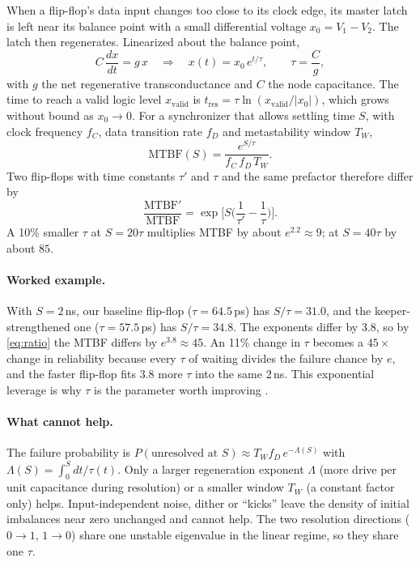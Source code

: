 \documentclass[11pt]{article}
\begin{document}
When a flip-flop's data input changes too close to its clock edge, its master latch is left near its balance point
with a small differential voltage $x_0 = V_1 - V_2$. The latch then regenerates. Linearized about the balance point,
\begin{equation}
C\,\frac{dx}{dt} = g\,x \quad\Longrightarrow\quad x(t) = x_0\,e^{t/\tau},\qquad \tau = \frac{C}{g},
\label{eq:lin}
\end{equation}
with $g$ the net regenerative transconductance and $C$ the node capacitance. The time to reach a valid logic level
$x_{\mathrm{valid}}$ is $t_{\mathrm{res}} = \tau\ln(x_{\mathrm{valid}}/|x_0|)$, which grows without bound as $x_0\to0$.
For a synchronizer that allows settling time $S$, with clock frequency $f_C$, data transition rate $f_D$ and
metastability window $T_W$,
\begin{equation}
\mathrm{MTBF}(S) = \frac{e^{S/\tau}}{f_C\,f_D\,T_W}.
\label{eq:mtbf}
\end{equation}
Two flip-flops with time constants $\tau'$ and $\tau$ and the same prefactor therefore differ by
\begin{equation}
\frac{\mathrm{MTBF}'}{\mathrm{MTBF}} = \exp\!\Big[S\Big(\frac{1}{\tau'}-\frac{1}{\tau}\Big)\Big].
\label{eq:ratio}
\end{equation}
A 10\% smaller $\tau$ at $S=20\tau$ multiplies MTBF by about $e^{2.2}\approx 9$; at $S=40\tau$ by about $85$.

\paragraph{Worked example.} With $S=2$\,ns, our baseline flip-flop ($\tau=64.5$\,ps) has $S/\tau=31.0$, and the
keeper-strengthened one ($\tau=57.5$\,ps) has $S/\tau=34.8$. The exponents differ by 3.8, so by \eqref{eq:ratio} the
MTBF differs by $e^{3.8}\approx45$. An 11\% change in $\tau$ becomes a $45\times$ change in reliability because
every $\tau$ of waiting divides the failure chance by $e$, and the faster flip-flop fits 3.8 more $\tau$ into the
same 2\,ns.
This exponential leverage is why $\tau$ is the parameter worth improving \cite{ginosar2011}.

\paragraph{What cannot help.} The failure probability is
$P(\text{unresolved at } S) \approx T_W f_D\, e^{-\Lambda(S)}$ with $\Lambda(S)=\int_0^S dt/\tau(t)$. Only a larger
regeneration exponent $\Lambda$ (more drive per unit capacitance during resolution) or a smaller window $T_W$
(a constant factor only) helps. Input-independent noise, dither or ``kicks'' leave the density of initial
imbalances near zero unchanged and cannot help. The two resolution directions ($0\!\to\!1$, $1\!\to\!0$) share one
unstable eigenvalue in the linear regime, so they share one $\tau$.
\end{document}
